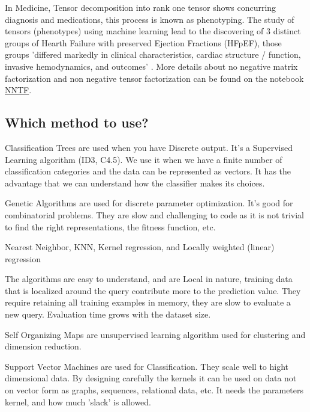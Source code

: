\documentclass[11pt,letterpaper]{report}
\begin{document}
 
In Medicine, Tensor decomposition into rank one tensor shows concurring diagnosis and medications, this process is known as phenotyping\cite{Ho}.  The study of tensors (phenotypes) using machine learning lead to the discovering of 3 distinct groups of Hearth Failure with preserved Ejection Fractions (HFpEF), those groups 'differed markedly in clinical characteristics, cardiac structure / function, invasive hemodynamics, and outcomes' \cite{Shah2015}. More details about no negative matrix factorization and non negative tensor factorization can be found on the notebook \href{ http://nbviewer.jupyter.org/mendozacortesgroup/machine_learning_class/blob/master/Lectures_Jupyter/L12_Non_Negative_Tensor_Factorization/Non\%20negative\%20tensor\%20factorization.ipynb}{NNTF}.
 
 

			
		
\subsection{Which method to use?}
Classification Trees are used when you have Discrete output. It's a Supervised Learning algorithm (ID3, C4.5). We use it when we have a finite number of classification categories and the data can be represented as vectors.
It has the advantage that we can understand how the classifier makes its choices.


Genetic Algorithms are used for discrete parameter optimization. It's good for combinatorial problems.
They are slow and  challenging to code as it is not trivial to  find the right representations, the fitness function, etc.




Nearest Neighbor, KNN, Kernel regression, and Locally weighted (linear) regression

The algorithms are easy to understand, and are Local in nature, training data that is localized around the query contribute more to the prediction value.
They require retaining all training examples in memory, they are slow to evaluate a new query. Evaluation time grows with the dataset size.

Self Organizing Maps are unsupervised learning algorithm used for clustering and dimension reduction.


Support Vector Machines are used for Classification.
They scale well to hight dimensional data.
By designing carefully the kernels it can be used on data not on vector form as graphs, sequences, relational data, etc. It needs the parameters kernel, and how much 'slack' is allowed.
\end{document}
